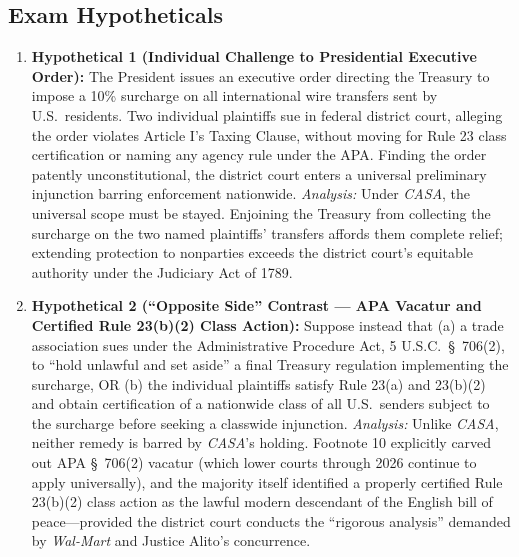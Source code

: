 \documentclass[12pt]{article}
\begin{document}
\subsection{Exam Hypotheticals}
\begin{enumerate}
  \item \textbf{Hypothetical 1 (Individual Challenge to Presidential Executive Order):} The President issues an executive order directing the Treasury to impose a 10\% surcharge on all international wire transfers sent by U.S.\ residents. Two individual plaintiffs sue in federal district court, alleging the order violates Article I's Taxing Clause, without moving for Rule 23 class certification or naming any agency rule under the APA. Finding the order patently unconstitutional, the district court enters a universal preliminary injunction barring enforcement nationwide. \textit{Analysis:} Under \textit{CASA}, the universal scope must be stayed. Enjoining the Treasury from collecting the surcharge on the two named plaintiffs' transfers affords them complete relief; extending protection to nonparties exceeds the district court's equitable authority under the Judiciary Act of 1789.
  \item \textbf{Hypothetical 2 (``Opposite Side'' Contrast --- APA Vacatur and Certified Rule 23(b)(2) Class Action):} Suppose instead that (a) a trade association sues under the Administrative Procedure Act, 5 U.S.C.\ \S\ 706(2), to ``hold unlawful and set aside'' a final Treasury regulation implementing the surcharge, OR (b) the individual plaintiffs satisfy Rule 23(a) and 23(b)(2) and obtain certification of a nationwide class of all U.S.\ senders subject to the surcharge before seeking a classwide injunction. \textit{Analysis:} Unlike \textit{CASA}, neither remedy is barred by \textit{CASA}'s holding. Footnote 10 explicitly carved out APA \S\ 706(2) vacatur (which lower courts through 2026 continue to apply universally), and the majority itself identified a properly certified Rule 23(b)(2) class action as the lawful modern descendant of the English bill of peace---provided the district court conducts the ``rigorous analysis'' demanded by \textit{Wal-Mart} and Justice Alito's concurrence.
\end{enumerate}
\end{document}
